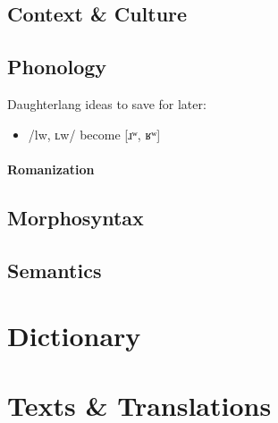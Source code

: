 \documentclass[a4paper,11pt,oneside,openany]{memoir}
\newcommand{\bripa}[1]{[#1]}
\newcommand{\phipa}[1]{/#1/}
\newcommand{\alvr}{ɹ}
\newcommand{\vell}{ʟ}
\newcommand{\velr}{ʁ}
\newcommand{\lab}{ʷ}
\begin{document}
\chapter{Context \& Culture}

\chapter{Phonology}

Daughterlang ideas to save for later:

\begin{itemize}
    \item \phipa{lw, \vell w} become \bripa{\alvr\lab, \velr\lab}
\end{itemize}

\subsection{Romanization}

\chapter{Morphosyntax}

\chapter{Semantics}

\part{Dictionary}



\part{Texts \& Translations}

\end{document}

